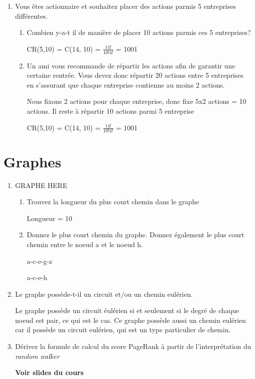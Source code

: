 \documentclass[A4paper,11pt]{article}
\begin{document}
\begin{enumerate}
\begin{enumerate}
        
    \end{enumerate}
    
    \item Vous êtes actionnaire et souhaitez placer des actions parmis 5 entreprises différentes.
    \begin{enumerate}
        \item Combien y-a-t il de manière de placer 10 actions parmis ces 5 entreprises?
        
        CR(5,10) = C(14, 10) = $\frac{14!}{10!4!}$ = 1001
        
        \item Un ami vous recommande de répartir les actions afin de garantir une certaine rentrée. Vous devez donc répartir 20 actions entre 5 entreprises en s'assurant que chaque entreprise contienne au moins 2 actions.
        
        \vspace{2ex}
        Nous fixons 2 actions pour chaque entreprise, donc fixe 5x2 actions = 10 actions. Il reste à répartir 10 actions parmi 5 entreprise
        
                CR(5,10) = C(14, 10) = $\frac{14!}{10!4!}$ = 1001
    \end{enumerate}
\end{enumerate}

\section{Graphes}
\begin{enumerate}
    \item GRAPHE HERE\begin{enumerate}
    \item Trouvez la longueur du plus court chemin dans le graphe 
    
    Longueur = 10
    
    
    \item Donnez le plus court chemin du graphe. Donnez également le plus court chemin entre le noeud a et le noeud h.
    
    a-c-e-g-z
    
    a-c-e-h
    
    \end{enumerate}
    \item Le graphe possède-t-il un circuit et/ou un chemin eulérien.
    
    \vspace{2ex}
    Le graphe possède un circuit éulérien si et seulement si le degré de chaque noeud est pair, ce qui est le cas. Ce graphe possède aussi un chemin eulérien car il possède un circuit eulérien, qui est un type particulier de chemin.
    \vspace{2ex}
    
    \item Dérivez la formule de calcul du score PageRank à partir de l'interprétation du \textit{random walker}
    
    \textbf{Voir slides du cours}
\end{enumerate}
\end{document}
